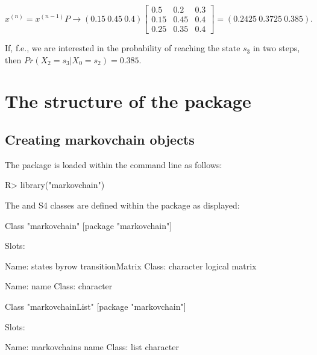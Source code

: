\documentclass[nojss]{jss}
\begin{document}
\begin{equation}
x^{(n)}=x^{(n-1)}P \to \left(0.15\:0.45\:0.4\right)\left[\begin{array}{ccc}
0.5 & 0.2 & 0.3\\
0.15 & 0.45 & 0.4\\
0.25 & 0.35 & 0.4
\end{array}\right]=\left(0.2425\:0.3725\:0.385\right).
\label{eq:trPropExEx3}
\end{equation}


If, f.e., we are interested in the probability of reaching the state $s_{3}$ in two steps, then $Pr\left(X_{2}=s_{3}\left|X_{0}=s_{2}\right.\right)=0.385$.

\newpage

\section{The structure of the package}\label{sec:structure}



\subsection{Creating markovchain objects}

The package is loaded within the  command line as follows:

\begin{Schunk}
\begin{Sinput}
R> library("markovchain")
\end{Sinput}
\end{Schunk}



The  and    S4 classes \citep{chambers}
are defined within the  package as displayed:

\begin{Schunk}
\begin{Soutput}
Class "markovchain" [package "markovchain"]

Slots:
                                                         
Name:            states            byrow transitionMatrix
Class:        character          logical           matrix
                       
Name:              name
Class:        character
\end{Soutput}
\begin{Soutput}
Class "markovchainList" [package "markovchain"]

Slots:
                                
Name:  markovchains         name
Class:         list    character
\end{Soutput}
\end{Schunk}
\end{document}
